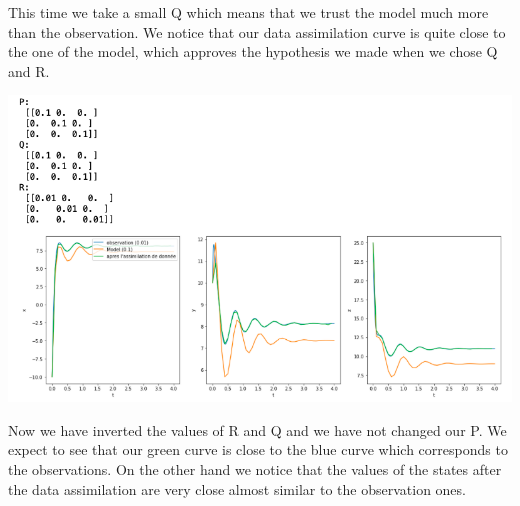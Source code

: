 This time we take a small Q which means that we trust the model much more than the observation. We notice that our data assimilation curve is quite close to the one of the model, which approves the hypothesis we made when we chose Q and R.
 \begin{center}
		\includegraphics[width=1\textwidth]{"images/lorenz3.png"}
\end{center}
Now we have inverted the values of R and Q and we have not changed our P. We expect to see that our green curve is close to the blue curve which corresponds to the observations. On the other hand we notice that the values of the states after the data assimilation are very close almost similar to the observation ones.

